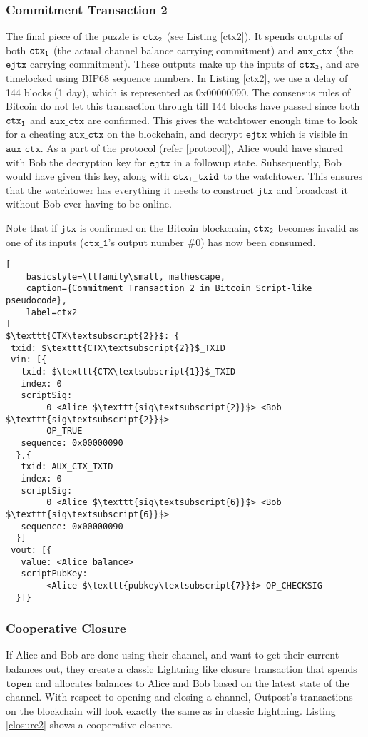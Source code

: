 \subsubsection{Commitment Transaction 2}
The final piece of the puzzle is $\texttt{ctx\textsubscript{2}}$ (see Listing \ref{ctx2}). It spends outputs of both $\texttt{ctx\textsubscript{1}}$ (the actual channel balance carrying commitment) and $\texttt{aux\_ctx}$ (the $\texttt{ejtx}$ carrying commitment). These outputs make up the inputs of $\texttt{ctx\textsubscript{2}}$, and are timelocked using BIP68 \cite{BIP68} sequence numbers. In Listing \ref{ctx2}, we use a delay of 144 blocks (1 day), which is represented as 0x00000090. The consensus rules of Bitcoin do not let this transaction through till 144 blocks have passed since both $\texttt{ctx\textsubscript{1}}$ and $\texttt{aux\_ctx}$ are confirmed. This gives the watchtower enough time to look for a cheating $\texttt{aux\_ctx}$ on the blockchain, and decrypt $\texttt{ejtx}$ which is visible in $\texttt{aux\_ctx}$. As a part of the protocol (refer \ref{protocol}), Alice would have shared with Bob the decryption key for $\texttt{ejtx}$ in a followup state. Subsequently, Bob would have given this key, along with $\texttt{ctx\textsubscript{1}\_txid}$ to the watchtower. This ensures that the watchtower has everything it needs to construct $\texttt{jtx}$ and broadcast it without Bob ever having to be online. 

Note that if $\texttt{jtx}$ is confirmed on the Bitcoin blockchain, $\texttt{ctx\textsubscript{2}}$ becomes invalid as one of its inputs ($\texttt{ctx_1}$'s output number \#0) has now been consumed. 

\begin{lstlisting}[
    basicstyle=\ttfamily\small, mathescape,
    caption={Commitment Transaction 2 in Bitcoin Script-like pseudocode},
    label=ctx2
]
$\texttt{CTX\textsubscript{2}}$: {
 txid: $\texttt{CTX\textsubscript{2}}$_TXID
 vin: [{
   txid: $\texttt{CTX\textsubscript{1}}$_TXID
   index: 0
   scriptSig: 
        0 <Alice $\texttt{sig\textsubscript{2}}$> <Bob $\texttt{sig\textsubscript{2}}$>
        OP_TRUE
   sequence: 0x00000090
  },{
   txid: AUX_CTX_TXID
   index: 0
   scriptSig: 
        0 <Alice $\texttt{sig\textsubscript{6}}$> <Bob $\texttt{sig\textsubscript{6}}$>
   sequence: 0x00000090
  }]
 vout: [{
   value: <Alice balance>
   scriptPubKey: 
        <Alice $\texttt{pubkey\textsubscript{7}}$> OP_CHECKSIG
  }]}
\end{lstlisting}

\subsubsection{Cooperative Closure}
If Alice and Bob are done using their channel, and want to get their current balances out, they create a classic Lightning like closure transaction that spends $\texttt{topen}$ and allocates balances to Alice and Bob based on the latest state of the channel. With respect to opening and closing a channel, Outpost's transactions on the blockchain will look exactly the same as in classic Lightning. Listing \ref{closure2} shows a cooperative closure.

